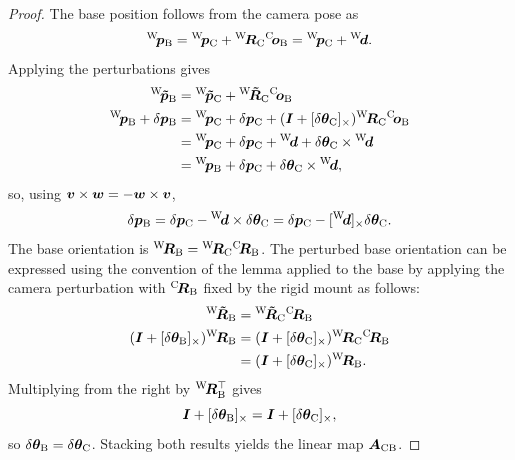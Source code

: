 \documentclass{article}
\newcommand{\thetab}{\bm{\theta}}
\begin{document}
\begin{proof}
The base position follows from the camera pose as
\[
{}^{\mathrm{W}}\! \bm{p}_{\mathrm{B}} = {}^{\mathrm{W}}\! \bm{p}_{\mathrm{C}} + {}^{\mathrm{W}}\! \bm{R}_{\mathrm{C}} {}^{\mathrm{C}}\! \bm{o}_{\mathrm{B}} = {}^{\mathrm{W}}\! \bm{p}_{\mathrm{C}} + {}^{\mathrm{W}}\! \bm{d}.
\]
Applying the perturbations gives
\begin{align*}
\inW \pbt_\B &= \inW \pbt_\C + \inW \Rbt_\C \inC \ob_\B\\
\inW \pb_\B + \delta\pb_\B
&= \inW \pb_\C + \delta\pb_\C + (\Ib + [\delta\thetab_\C]_\times) \inW \Rb_\C \inC \ob_\B\\
&= \inW \pb_\C + \delta\pb_\C + \inW \db + \delta\thetab_\C \times \inW \db\\
&= \inW \pb_\B + \delta\pb_\C + \delta\thetab_\C \times \inW \db,
\end{align*}
so, using $\bm{v} \times \bm{w} = -\bm{w} \times \bm{v}$,
\[
\delta\pb_\B = \delta\pb_\C - \inW \db \times \delta\thetab_\C = \delta\pb_\C- [\inW \db]_\times \delta\thetab_\C.
\]
The base orientation is ${}^{\mathrm{W}}\! \bm{R}_{\mathrm{B}} = {}^{\mathrm{W}}\! \bm{R}_{\mathrm{C}} {}^{\mathrm{C}}\! \bm{R}_{\mathrm{B}}$. The perturbed base orientation can be expressed using the convention of the lemma applied to the base by applying the camera perturbation with ${}^{\mathrm{C}}\! \bm{R}_{\mathrm{B}}$ fixed by the rigid mount as follows:
\begin{align*}
\inW \Rbt_\B &= \inW \Rbt_\C\inC \Rb_\B\\
(\Ib + [\delta\thetab_\B]_\times) \inW \Rb_\B
&= (\Ib + [\delta\thetab_\C]_\times) \inW \Rb_\C \inC \Rb_\B\\
&= (\Ib + [\delta\thetab_\C]_\times) \inW \Rb_\B.
\end{align*}
Multiplying from the right by ${}^{\mathrm{W}}\! \bm{R}_{\mathrm{B}}^\top$ gives
\[
\Ib + [\delta\thetab_\B]_\times = \Ib + [\delta\thetab_\C]_\times,
\]
so $\delta\thetab_\B = \delta\thetab_\C$.
Stacking both results yields the linear map $\bm{A}_\mathrm{CB}$.
\end{proof}
\end{document}
